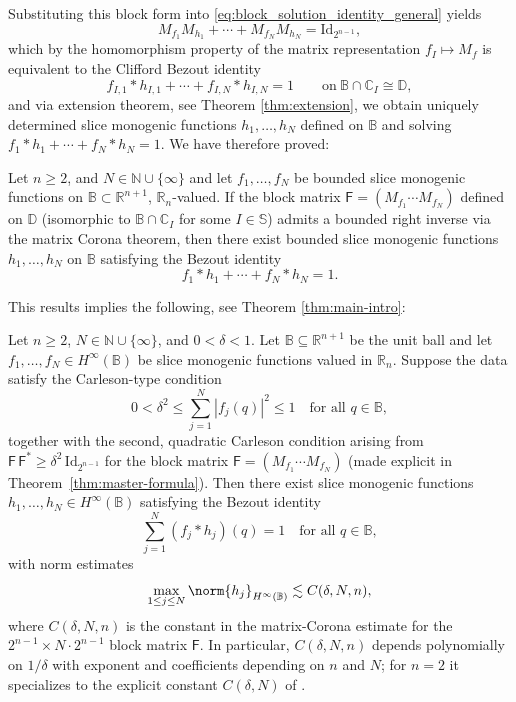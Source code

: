 \documentclass[11pt]{amsart}
\begin{document}
Substituting this block form into \eqref{eq:block_solution_identity_general} yields
\[
M_{f_1} M_{h_1} + \cdots + M_{f_N} M_{h_N} = \mathrm{Id}_{2^{n-1}},
\]
which by the homomorphism property of the matrix representation $f_I \mapsto M_{f}$ is equivalent to the Clifford Bezout identity
\[
f_{I,1} * h_{I,1} + \cdots + f_{I,N} * h_{I,N} = 1 \qquad \text{on}\ \mathbb B\cap\mathbb{C}_I\cong \mathbb D,
\]
and via extension theorem, see Theorem \ref{thm:extension}, we obtain uniquely determined slice monogenic functions $h_1,\ldots , h_N$ defined on $\mathbb B$ and solving $f_1*h_1+\cdots +f_N*h_N=1$.
We have therefore proved:


\begin{thm}\label{thm:corona-general}
Let $n \ge 2$, and $N\in\mathbb{N}\cup\{\infty\}$ and let $f_{1}, \ldots, f_{N}$ be bounded slice monogenic functions on $\mathbb{B}\subset\mathbb{R}^{n+1}$, $\mathbb{R}_n$-valued. If the block matrix $\mathsf{F} = (M_{f_1} \cdots M_{f_N})$ defined on $\mathbb D$ (isomorphic to $\mathbb{B} \cap \mathbb{C}_I$ for some $I\in\mathbb S$) admits a bounded right inverse via the matrix Corona theorem, then there exist bounded slice monogenic functions $h_{1}, \ldots, h_{N}$ on $\mathbb{B}$ satisfying the Bezout identity
\[
f_{1} * h_{1} + \cdots + f_{N} * h_{N} = 1.
\]
\end{thm}

This results implies the following, see Theorem \ref{thm:main-intro}:
\begin{thm}
Let $n\ge 2$, $N\in\mathbb{N}\cup\{\infty\}$, and $0<\delta<1$.  Let $\mathbb B\subseteq\mathbb{R}^{n+1}$ be the unit ball and let $f_{1},\ldots,f_{N}\in H^\infty(\mathbb B)$ be slice monogenic functions valued in $\mathbb{R}_n$.  Suppose the data satisfy the Carleson-type condition
\[
0<\delta^2\le \sum_{j=1}^N |f_{j}(q)|^2\le 1\quad\text{for all }q\in \mathbb B,
\]
together with the second, quadratic Carleson condition arising from $\mathsf{F}\,\mathsf{F}^\ast\ge\delta^2\,\mathrm{Id}_{2^{n-1}}$ for the block matrix $\mathsf{F}=(M_{f_1}\cdots M_{f_N})$ (made explicit in Theorem~\ref{thm:master-formula}).  Then there exist slice monogenic functions $h_{1},\ldots,h_{N}\in H^\infty(\mathbb B)$ satisfying the Bezout identity
\[
\sum_{j=1}^{N} (f_{j}\ast h_{j})(q)=1\quad\text{for all }q\in \mathbb B,
\]
with norm estimates
\begin{equation}
\max_{1\le j\le N}\norm{h_{j}}_{H^\infty(\mathbb B)}\lesssim C(\delta,N,n),\label{estim}
\end{equation}
where $C(\delta,N,n)$ is the constant in the matrix-Corona estimate for the $2^{n-1}\times N\cdot 2^{n-1}$ block matrix $\mathsf{F}$.  In particular, $C(\delta,N,n)$ depends polynomially on $1/\delta$ with exponent and coefficients depending on $n$ and $N$; for $n=2$ it specializes to the explicit constant $C(\delta,N)$ of \cite{CPSW}.
\end{thm}
\end{document}
